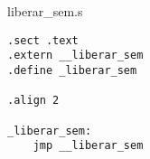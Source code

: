 liberar\_sem.s

\begin{verbatim}
.sect .text
.extern __liberar_sem
.define _liberar_sem

.align 2

_liberar_sem:
	jmp __liberar_sem
\end{verbatim}
